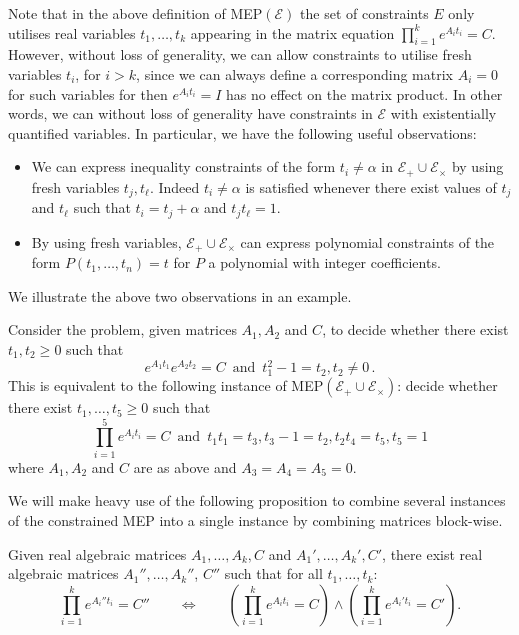 \documentclass[format=acmsmall, review=false, screen=true]{acmart}
\begin{document}
Note that in the above definition of MEP$(\mathcal{E})$ the set of
constraints $E$ only utilises real variables $t_1,\ldots,t_k$
appearing in the matrix equation $\prod_{i=1}^{k} e^{A_{i} t_{i}}=C$.
However, without loss of generality, we can allow constraints to
utilise fresh variables $t_{i}$, for $i>k$, since we can always define a
corresponding matrix $A_i=0$ for such variables for then
$e^{A_{i} t_{i}}=I$ has no effect on the matrix product.  In other words,
we can without loss of generality have constraints in $\mathcal{E}$ with existentially
quantified variables.  In particular, we have the following
useful observations:

\begin{itemize}
\item[\textbullet] We can express inequality constraints of the form
  $t_{i}\neq \alpha$ in  $\mathcal{E}_{+}\cup \mathcal{E}_{\times}$ by
using fresh variables
  $t_{j},t_{\ell}$.  Indeed $t_{i} \neq \alpha$ is satisfied whenever there
  exist values of $t_{j}$ and $t_{\ell}$ such that $t_{i}=t_{j}+\alpha$ and
  $t_{j} t_{\ell}=1$.

\item[\textbullet] By using fresh variables,
  $\mathcal{E}_{+}\cup \mathcal{E}_{\times}$ can express polynomial
  constraints of the form $P(t_1,\ldots,t_n)=t$ for $P$ a polynomial
  with integer coefficients.
\end{itemize}

We illustrate the above two observations in an example.
\begin{example}
  Consider the problem, given matrices $A_1,A_2$ and $C$, to decide
  whether there exist $t_1,t_2 \geq 0$ such that
  \[ e^{A_1t_1}e^{A_2t_2}=C \,\mbox{ and }\, t_1^2-1=t_2, t_2\neq 0 \, .\]
  This is equivalent to the following instance of
  MEP$(\mathcal{E}_{+}\cup\mathcal{E}_{\times})$: decide whether there exist $t_1,\ldots,t_5\geq 0$ such that
\[ \prod_{i=1}^5 e^{A_{i} t_{i}}=C \,\mbox{ and }\, t_1t_1=t_3, t_3-1=t_2, t_2t_4=t_5, t_5=1\]
where $A_1,A_2$ and $C$ are as above and $A_3=A_4=A_5=0$.
\end{example}

We will make heavy use of the following proposition to combine several
instances of the constrained MEP into a single instance by combining
matrices block-wise.
\begin{proposition}\label{prop:remark}
  Given real algebraic matrices $A_1,\ldots,A_k,C$ and
  $A_1',\ldots,A_k',C'$, there exist real algebraic matrices
  $A_1'',\ldots,A_k''$, $C''$ such that for all $t_1,\ldots,t_k$:
  \[\prod_{i=1}^{k} e^{A_{i}''t_{i}}=C''\qquad\Leftrightarrow\qquad\left(\prod_{i=1}^{k} e^{A_{i} t_{i}}=C\right)\wedge\left(\prod_{i=1}^{k} e^{A_i't_{i}}=C'\right).\]
\label{prop:combine}
\end{proposition}
\end{document}

